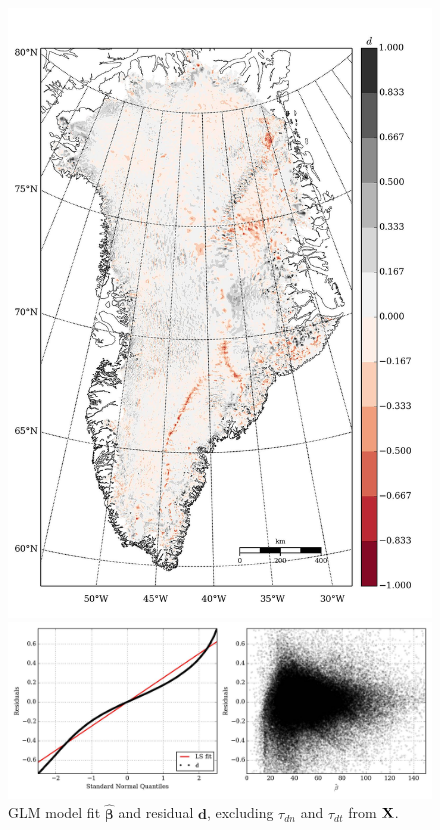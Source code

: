 \begin{figure}
\begin{minipage}[b]{0.47\linewidth}
    \includegraphics[width=1.0\textwidth]{images/greenland/stats/GLM_resid_no_driving_stress.jpg}
  \end{minipage}
  \begin{minipage}[b]{0.99\linewidth}
    \includegraphics[width=1.0\textwidth]{images/greenland/stats/GLM_resid-NQ_no_driving_stress.jpg}
  \end{minipage}
  \caption[]{GLM model fit $\bm{\hat{\beta}}$ and residual $\mathbf{d}$, excluding $\tau_{dn}$ and $\tau_{dt}$ from $\mathbf{X}$.}
\end{figure}

